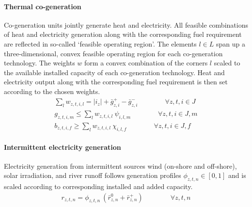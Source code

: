 \documentclass[11pt,a4paper]{article}
\begin{document}
\paragraph{Thermal co-generation}
Co-generation units jointly generate heat and electricity. All feasible combinations of heat and electricity generation along with the corresponding fuel requirement are reflected in so-called `feasible operating region'. 
The elements $l \in L$ span up a three-dimensional, convex feasible operating region for each co-generation technology. 
The weights $w$ form a convex combination of the corners $l$ scaled to the available installed capacity of each co-generation technology.
Heat and electricity output along with the corresponding fuel requirement is then set according to the chosen weights.
\begin{align}
\sum_{l} w_{z,t,i,l} = |i_{z}| + \bar{g}^{+}_{z,i} - \bar{g}^{-}_{z,i} \qquad \qquad \forall z,t,i \in J \\
g_{z,t,i,m} \leq \sum_{l} w_{z,t,i,l} \: \psi_{i,l,m} \qquad \qquad \forall z,t,i \in J, m \\
b_{z,t,i,f} \geq \sum_{l} w_{z,t,i,l} \: \chi_{i,l,f} \qquad \qquad \forall z,t,i \in J, f
\end{align}

\paragraph{Intermittent electricity generation}
Electricity generation from intermittent sources wind (on-shore and off-shore), solar irradiation, and river runoff follows generation profiles $\phi_{z,t,n} \in [0,1]$ and is scaled according to corresponding installed and added capacity.
\begin{align}
r_{z,t,n} = \phi_{z,t,n} \: \left( \bar{r}^{0}_{z,n} + \bar{r}^{+}_{z,n} \right) \qquad \qquad \forall z,t,n
\end{align}
\end{document}
